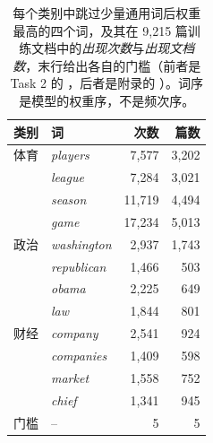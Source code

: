 \begin{table}[t]
\centering
\footnotesize
\caption{每个类别中跳过少量通用词后权重最高的四个词，及其在 9{,}215 篇训练文档中的\emph{出现次数}与\emph{出现文档数}，末行给出各自的门槛（前者是 Task 2 的 ，后者是附录的 ）。词序是模型的权重序，不是频次序。}
\label{tab:keyword-freq}
\begin{tabular}{llrr}
\toprule
类别 & 词 & 次数 & 篇数 \\
\midrule
体育 & \emph{players} & 7,577 & 3,202 \\
 & \emph{league} & 7,284 & 3,021 \\
 & \emph{season} & 11,719 & 4,494 \\
 & \emph{game} & 17,234 & 5,013 \\
\midrule
政治 & \emph{washington} & 2,937 & 1,743 \\
 & \emph{republican} & 1,466 & 503 \\
 & \emph{obama} & 2,225 & 649 \\
 & \emph{law} & 1,844 & 801 \\
\midrule
财经 & \emph{company} & 2,541 & 924 \\
 & \emph{companies} & 1,409 & 598 \\
 & \emph{market} & 1,558 & 752 \\
 & \emph{chief} & 1,341 & 945 \\
\midrule
门槛 & -- & 5 & 5 \\
\bottomrule
\end{tabular}
\end{table}
